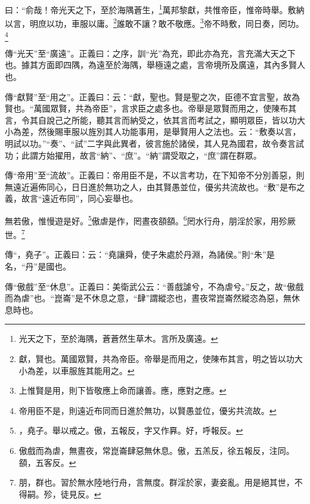 曰：“俞哉！帝光天之下，至於海隅蒼生，\footnote{光天之下，至於海隅，蒼蒼然生草木。言所及廣遠。}萬邦黎獻，共惟帝臣，惟帝時舉。敷納以言，明庶以功，車服以庸。\footnote{獻，賢也。萬國眾賢，共為帝臣。帝舉是而用之，使陳布其言，明之皆以功大小為差，以車服旌其能用之。}誰敢不讓？敢不敬應。\footnote{上惟賢是用，則下皆敬應上命而讓善。應，應對之應。}帝不時敷，同日奏，罔功。\footnote{帝用臣不是，則遠近布同而日進於無功，以賢愚並位，優劣共流故。}


{\noindent\zhuan{}\fzbyks 傳“光天”至“廣遠”。正義曰：之序，訓“光”為充，即此亦為充，言充滿大天之下也。據其方面即四隅，為遠至於海隅，舉極遠之處，言帝境所及廣遠，其內多賢人也。 \par}

{\noindent\zhuan{}\fzbyks 傳“獻賢”至“用之”。正義曰：云：“獻，聖也。賢是聖之次，臣德不宜言聖，故為賢也。“萬國眾賢，共為帝臣”，言求臣之處多也。帝舉是眾賢而用之，使陳布其言，令其自說己之所能，聽其言而納受之，依其言而考試之，顯明眾臣，皆以功大小為差，然後賜車服以旌別其人功能事用，是舉賢用人之法也。云：“敷奏以言，明試以功。”“奏”、“試”二字與此異者，彼言施於諸侯，其人見為國君，故令奏言試功；此謂方始擢用，故言“納”、“庶”。“納”謂受取之，“庶”謂在群眾。 \par}

{\noindent\zhuan{}\fzbyks 傳“帝用”至“流故”。正義曰：帝用臣不是，不以言考功，在下知帝不分別善惡，則無遠近遍佈同心，日日進於無功之人，由其賢愚並位，優劣共流故也。“敷”是布之義，故言“遠近布同”，同心妄舉也。 \par}

無若傲，惟慢遊是好。\footnote{，堯子。舉以戒之。傲，五報反，字又作奡。好，呼報反。}傲虐是作，罔晝夜頟頟。\footnote{傲戲而為虐，無晝夜，常崑崙肆惡無休息。傲，五羔反，徐五報反，注同。頟，五客反。}罔水行舟，朋淫於家，用殄厥世。\footnote{朋，群也。習於無水陸地行舟，言無度。群淫於家，妻妾亂。用是絕其世，不得嗣。殄，徒見反。}


{\noindent\zhuan{}\fzbyks 傳“，堯子”。正義曰：云：“堯讓舜，使子朱處於丹淵，為諸侯。”則“朱”是名，“丹”是國也。 \par}

{\noindent\zhuan{}\fzbyks 傳“傲戲”至“休息”。正義曰：美衛武公云：“善戲謔兮，不為虐兮。”反之，故“傲戲而為虐”也。“崑崙”是不休息之意，“肆”謂縱恣也，晝夜常崑崙然縱恣為惡，無休息時也。 \par}

